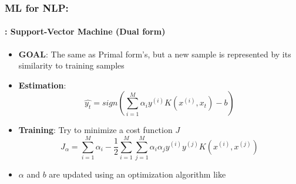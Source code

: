 \documentclass[xcolor=table]{beamer}
\begin{document}
	\begin{frame}
		\frametitle{ML for NLP: \insertsection}
		\framesubtitle{\insertsubsection: Support-Vector Machine (Dual form)}
		
		\begin{minipage}{0.75\textwidth} 
			\begin{itemize}
				\item \textbf{GOAL}: The same as Primal form's, but a new sample is represented by its similarity to training samples
				\item \textbf{Estimation}: 
				\[\hat{y_t} = sign(\sum^M_{i=1} \alpha_i y^{(i)} K(x^{(i)}, x_t) - b)\]
			\end{itemize}
		\end{minipage}
		\begin{minipage}{0.24\textwidth} 
		\end{minipage}
	
	
		\begin{itemize}
			\item \textbf{Training}: Try to minimize a cost function $ J $
			\[J_\alpha = \sum\limits_{i=1}^{M} \alpha_i - \frac{1}{2} \sum\limits_{i=1}^{M} \sum\limits_{j=1}^{M} \alpha_i \alpha_j y^{(i)} y^{(j)} K(x^{(i)}, x^{(j)})\]
			\item $\alpha$ and $ b $ are updated using an optimization algorithm like 
		\end{itemize}
		
	\end{frame}
\end{document}
